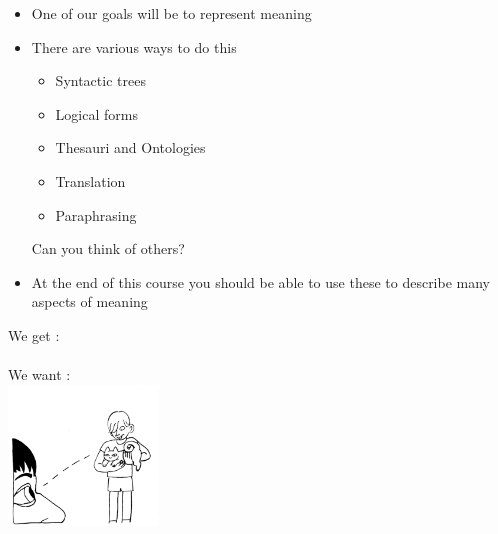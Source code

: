 \documentclass[headrule,footrule]{foils}
\begin{document}
\begin{itemize}
\item One of our goals will be to represent meaning
\item There are various ways to do this
  \begin{itemize}
  \item Syntactic trees
  \item Logical forms
  \item Thesauri and Ontologies
  \item Translation
  \item Paraphrasing
  \end{itemize}
Can you think of others?

\item At the end of this course you should be able to use these to
  describe many aspects of meaning
\end{itemize}

\begin{center}
\large We get : \\[2ex]
    \Large {} \\[3ex]
We want :
\\  \includegraphics[width=0.3\textwidth]{pics/1.png}
\end{center}
\end{document}
